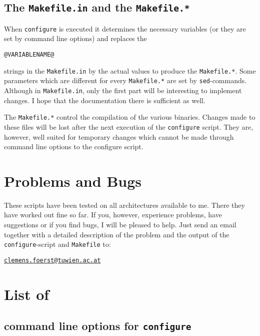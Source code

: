 \documentclass[a4paper,10pt]{article}
\begin{document}
\subsection{The \texttt{Makefile.in} and the \texttt{Makefile.*}}

When \texttt{configure} is executed it determines the necessary variables (or
they are set by command line options) and replaces the
\begin{verbatim}
@VARIABLENAME@
\end{verbatim}
strings in the \texttt{Makefile.in} by the actual values to produce the
\texttt{Makefile.*}.  Some parameters which are different for every
\texttt{Makefile.*} are set by \texttt{sed}-commands.  Although in
\texttt{Makefile.in}, only the first part will be interesting to implement
changes.  I hope that the documentation there is sufficient as well.

The \texttt{Makefile.*} control the compilation of the various binaries.
Changes made to these files will be lost after the next execution of the
\texttt{configure} script.  They are, however, well suited for temporary
changes which cannot be made through command line options to the configure
script.




\section{Problems and Bugs}

These scripts have been tested on all architectures available to me.  There
they have worked out fine so far.  If you, however, experience problems, have
suggestions or if you find bugs, I will be pleased to help.  Just send an email
together with a detailed description of the problem and the output of the
\texttt{configure}-script and \texttt{Makefile} to:

\underline{\texttt{clemens.foerst@tuwien.ac.at}}

\clearpage
\section*{List of}

\subsection*{command line options for \texttt{configure}}
\end{document}
